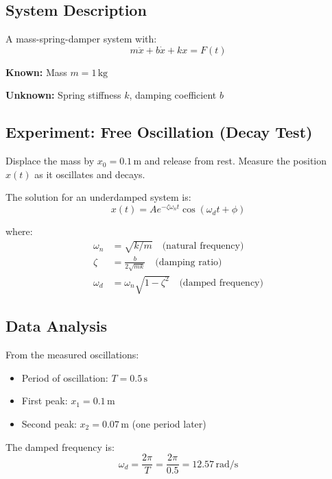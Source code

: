 \subsection{System Description}

A mass-spring-damper system with:
\begin{equation}
m\ddot{x} + b\dot{x} + kx = F(t)
\end{equation}

\textbf{Known:} Mass $m = 1 \, \text{kg}$

\textbf{Unknown:} Spring stiffness $k$, damping coefficient $b$

\subsection{Experiment: Free Oscillation (Decay Test)}

Displace the mass by $x_0 = 0.1 \, \text{m}$ and release from rest. Measure the position $x(t)$ as it oscillates and decays.

The solution for an underdamped system is:
\begin{equation}
x(t) = Ae^{-\zeta\omega_n t}\cos(\omega_d t + \phi)
\end{equation}

where:
\begin{align}
\omega_n &= \sqrt{k/m} \quad \text{(natural frequency)} \\
\zeta &= \frac{b}{2\sqrt{mk}} \quad \text{(damping ratio)} \\
\omega_d &= \omega_n\sqrt{1 - \zeta^2} \quad \text{(damped frequency)}
\end{align}

\subsection{Data Analysis}

From the measured oscillations:
\begin{itemize}
    \item Period of oscillation: $T = 0.5 \, \text{s}$
    \item First peak: $x_1 = 0.1 \, \text{m}$
    \item Second peak: $x_2 = 0.07 \, \text{m}$ (one period later)
\end{itemize}

The damped frequency is:
\begin{equation}
\omega_d = \frac{2\pi}{T} = \frac{2\pi}{0.5} = 12.57 \, \text{rad/s}
\end{equation}

